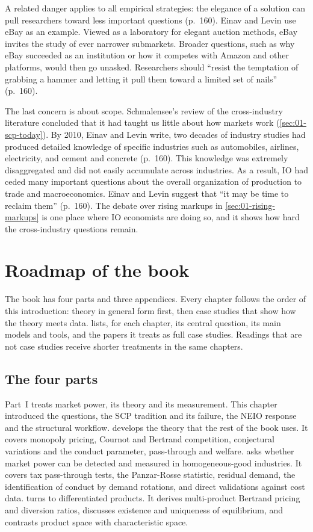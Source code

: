 A related danger applies to all empirical strategies: the elegance of a solution can pull researchers toward
less important questions (p.~160). Einav and Levin use eBay as an example. Viewed as a laboratory for elegant
auction methods, eBay invites the study of ever narrower submarkets. Broader questions, such as why eBay
succeeded as an institution or how it competes with Amazon and other platforms, would then go unasked.
Researchers should ``resist the temptation of grabbing a hammer and letting it pull them toward a limited set
of nails'' (p.~160).

The last concern is about scope. Schmalensee's review of the cross-industry literature concluded that it had
taught us little about how markets work (\cref{sec:01-scp-today}). By 2010, Einav and Levin write, two
decades of industry studies had produced detailed knowledge of specific industries such as automobiles,
airlines, electricity, and cement and concrete (p.~160). This knowledge was extremely disaggregated and did
not easily accumulate across industries. As a result, IO had ceded many important questions about the overall organization of production to trade and macroeconomics.
Einav and Levin suggest that ``it may be time to reclaim them'' (p.~160). The debate over rising markups in
\cref{sec:01-rising-markups} is one place where IO economists are doing so, and it shows how hard the
cross-industry questions remain.

\section{Roadmap of the book}\label{sec:01-roadmap}

The book has four parts and three appendices. Every chapter follows the order of this introduction: theory in
general form first, then case studies that show how the theory meets data.  lists, for
each chapter, its central question, its main models and tools, and the papers it treats as full case studies.
Readings that are not case studies receive shorter treatments in the same chapters.

\subsection{The four parts}

Part~I treats market power, its theory and its measurement. This chapter introduced the questions, the SCP
tradition and its failure, the NEIO response and the structural workflow.  develops the theory that the
rest of the book uses. It covers monopoly pricing, Cournot and Bertrand competition, conjectural variations and
the conduct parameter, pass-through and welfare.  asks whether market power can be detected
and measured in homogeneous-good industries. It covers tax pass-through tests, the Panzar-Rosse statistic,
residual demand, the identification of conduct by demand rotations, and direct validations against cost data.
 turns to differentiated products. It derives multi-product Bertrand pricing and diversion
ratios, discusses existence and uniqueness of equilibrium, and contrasts product space with characteristic
space.

